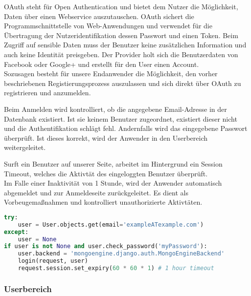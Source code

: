 OAuth steht für Open Authentication und bietet dem Nutzer die Möglichkeit, Daten über einen Webservice auszutauschen. \grqq{}OAuth sichert die Programmschnittstelle von Web-Anwendungen und verwendet für die Übertragung der Nutzeridentifikation dessen Passwort und einen Token\grqq{}\cite{OAUTH}. Beim Zugriff auf sensible Daten muss der Benutzer keine zusätzlichen Information und auch keine Identität preisgeben. Der Provider holt sich die Benutzerdaten von Facebook oder Google+ und erstellt für den User einen Account.\\
Sozusagen besteht für unsere Endanwender die Möglichkeit, den vorher beschriebenen Registierungsprozess auszulassen und sich direkt über OAuth zu registrieren und anzumelden.


Beim Anmelden wird kontrolliert, ob die angegebene Email-Adresse in der Datenbank existiert. Ist sie keinem Benutzer zugeordnet, existiert dieser nicht und die Authentifikation schlägt fehl. Andernfalls wird das eingegebene Passwort überprüft. Ist dieses korrekt, wird der Anwender in den Userbereich weitergeleitet.

Surft ein Benutzer auf unserer Seite, arbeitet im Hintergrund ein Session Timeout, welches die Aktivtät des eingeloggten Benutzer überprüft.\\
Im Falle einer Inaktivität von 1 Stunde, wird der Anwender automatisch abgemeldet und zur Anmeldeseite zurückgeleitet. Es dient als Vorbeugemaßnahmen und kontrolliert unauthorizierte Aktivtäten.

\begin{lstlisting}[caption={Session Timeout}, language=Python]
try:
    user = User.objects.get(email='exampleATexample.com')
except:
    user = None
if user is not None and user.check_password('myPassword'):
    user.backend = 'mongoengine.django.auth.MongoEngineBackend'
    login(request, user)
    request.session.set_expiry(60 * 60 * 1) # 1 hour timeout
\end{lstlisting}
\newpage 

\subsubsection{Userbereich}


